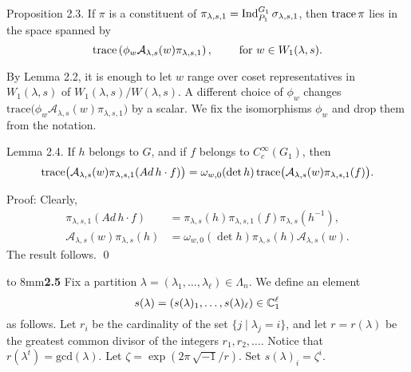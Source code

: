 \documentclass{amsart}
\begin{document}
\proclaim Proposition {2.3}.
If 
  $ \pi $
is a constituent of
  $ \pi_{\lambda,s,1} =
    \text{{\rm Ind}}_{P_1}^{G_1} \,
    \sigma_{\lambda,s,1} $,
then 
  $ \text{{\rm trace}}\,\pi $
lies in the space spanned by
%
$$
  \text{{\rm trace}} 
  \left(
    \phi_w 
    {\mathcal A}_{\lambda,s} (w)
    \pi_{\lambda,s,1}
  \right), \qquad\text{ for }
   w \in W_1(\lambda,s).
$$
%
\finishproclaim

By Lemma 2.2,
it is enough to let $w$ range over coset representatives in
  $ W_1(\lambda,s)  $
of
  $ W_1(\lambda,s) / W (\lambda,s) $.
A different choice of 
  $ \phi_w $
changes 
  $ \text{trace}
    \bigl(
       \phi_w
       {\mathcal A}_{\lambda,s} (w) 
       \pi_{\lambda,s,1} 
    \bigr) $
by a scalar.
We fix the isomorphisms
  $ \phi_w $
and drop them from the notation.

\proclaim Lemma {2.4}.
If
  $ h $ belongs to $G$,
  and if $ f$ belongs to $C_c^{\infty} (G_1) $, then
%
$$
  \text{{\rm trace}}
  \bigl(
    {\mathcal A}_{\lambda,s} (w)
    \pi_{\lambda,s,1}
    (Ad\,h \cdot f)
  \bigr) 
=
  \omega_{w,0} 
  (\det h) \,
  \text{{\rm trace}}
  \bigl(
    {\mathcal A}_{\lambda,s} (w)
    \pi_{\lambda,s,1}
    (f)
  \bigr) .
$$
%
\finishproclaim

\pproclaim Proof: Clearly,
%
\begin{align*}
  \pi_{\lambda,s,1} (Ad\,h \cdot f)
&=
  \pi_{\lambda,s}(h)
  \pi_{\lambda,s,1} (f) 
  \pi_{\lambda,s} (h^{-1}) ,
\\
  {\mathcal A}_{\lambda,s} (w)
  \pi_{\lambda,s} (h) 
&=
  \omega_{w,0} (\det h)
  \pi_{\lambda,s} (h) 
  {\mathcal A}_{\lambda,s} (w).
\end{align*}
%
The result follows.
\qed
\finishpproclaim

\noindent
\hbox to 8mm{{\bf 2.5}\hfil}
Fix a partition $\lambda =(\lambda_1,\ldots,\lambda_\ell)\in \Lambda_n$. We
define an element $$s(\lambda)=(s(\lambda)_1,\ldots,s(\lambda)_\ell)\in
{\Bbb C}_1^\ell$$ as follows.  Let $r_i$ be the cardinality of the
set $\{j\mid \lambda_j = i\}$, and let $r=r(\lambda)$ be the greatest
common divisor of the integers $r_1,r_2,\ldots$.  Notice that $r(\lambda^t) = \text{gcd}(\lambda)$.
Let $\zeta=\exp(2\pi\,\sqrt{-1}/r)$.  Set $s(\lambda)_i = \zeta^i$.
\end{document}
